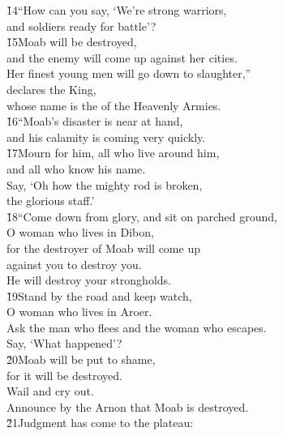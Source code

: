 \begin{poetry}
\poeml \v{14}``How can you say, `We're strong warriors, \\
\poemll    and soldiers ready for battle'? \\
\poeml \v{15}Moab will be destroyed, \\
\poemll    and the enemy will come up against her cities. \\
\poeml Her finest young men will go down to slaughter,'' \\
\poemll    declares the King, \\
\poemlll       whose name is the  of the Heavenly Armies. \\
\poeml \v{16}``Moab's disaster is near at hand, \\
\poemll    and his calamity is coming very quickly. \\
\poeml \v{17}Mourn for him, all who live around him, \\
\poemll    and all who know his name. \\
\poeml Say, `Oh how the mighty rod is broken, \\
\poemll    the glorious staff.' \\
\poeml \v{18}``Come down from glory, and sit on parched ground, \\
\poemll    O woman who lives in Dibon, \\
\poeml for the destroyer of Moab will come up \\
\poemll    against you to destroy you. \\
\poemlll       He will destroy your strongholds. \\
\poeml \v{19}Stand by the road and keep watch, \\
\poemll    O woman who lives in Aroer. \\
\poeml Ask the man who flees and the woman who escapes. \\
\poemll    Say, `What happened'? \\
\poeml \v{20}Moab will be put to shame, \\
\poemll    for it will be destroyed. \\
\poeml Wail and cry out. \\
\poemll    Announce by the Arnon that Moab is destroyed. \\
\poeml \v{21}Judgment has come to the plateau: \\

\end{poetry}
